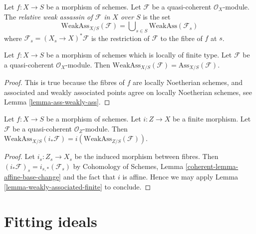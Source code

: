 \begin{definition}
\label{definition-relative-weak-assassin}
Let $f : X \to S$ be a morphism of schemes.
Let $\mathcal{F}$ be a quasi-coherent $\mathcal{O}_X$-module.
The {\it relative weak assassin of $\mathcal{F}$ in $X$ over $S$}
is the set
$$
\text{WeakAss}_{X/S}(\mathcal{F}) =
\bigcup\nolimits_{s \in S} \text{WeakAss}(\mathcal{F}_s)
$$
where $\mathcal{F}_s = (X_s \to X)^*\mathcal{F}$ is the restriction
of $\mathcal{F}$ to the fibre of $f$ at $s$.
\end{definition}

\begin{lemma}
\label{lemma-relative-weak-assassin-assassin-finite-type}
Let $f : X \to S$ be a morphism of schemes which is locally of finite type.
Let $\mathcal{F}$ be a quasi-coherent $\mathcal{O}_X$-module.
Then $\text{WeakAss}_{X/S}(\mathcal{F}) = \text{Ass}_{X/S}(\mathcal{F})$.
\end{lemma}

\begin{proof}
This is true because the fibres of $f$ are locally Noetherian schemes,
and associated and weakly associated points agree on locally Noetherian
schemes, see
Lemma \ref{lemma-ass-weakly-ass}.
\end{proof}

\begin{lemma}
\label{lemma-relative-weak-assassin-finite}
Let $f : X \to S$ be a morphism of schemes.
Let $i : Z \to X$ be a finite morphism.
Let $\mathcal{F}$ be a quasi-coherent $\mathcal{O}_Z$-module.
Then $\text{WeakAss}_{X/S}(i_*\mathcal{F}) =
i(\text{WeakAss}_{Z/S}(\mathcal{F}))$.
\end{lemma}

\begin{proof}
Let $i_s : Z_s \to X_s$ be the induced morphism between fibres.
Then $(i_*\mathcal{F})_s = i_{s, *}(\mathcal{F}_s)$ by
Cohomology of Schemes, Lemma \ref{coherent-lemma-affine-base-change}
and the fact that $i$ is affine. Hence
we may apply Lemma \ref{lemma-weakly-associated-finite} to conclude.
\end{proof}





\section{Fitting ideals}
\label{section-fitting-ideals}

